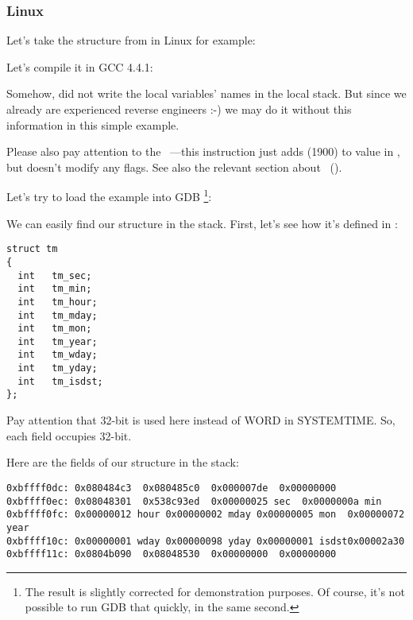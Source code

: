 ﻿\subsubsection{Linux}

Let's take the  structure from  in Linux for example:



Let's compile it in GCC 4.4.1:



Somehow, \IDA did not write the local variables' names in the local stack.
But since we already are experienced reverse engineers :-) we may do it without this information in 
this simple example.


Please also pay attention to the ~---this instruction just adds  (1900) to value in \EAX,
but doesn't modify any flags. See also the relevant section about \LEA{}~().


Let's try to load the example into GDB
\footnote{The  result is slightly corrected for demonstration purposes.
Of course, it's not possible to run GDB that quickly, in the same second.}:



We can easily find our structure in the stack.
First, let's see how it's defined in :

\begin{lstlisting}[caption=time.h, label=struct_tm]
struct tm
{
  int	tm_sec;
  int	tm_min;
  int	tm_hour;
  int	tm_mday;
  int	tm_mon;
  int	tm_year;
  int	tm_wday;
  int	tm_yday;
  int	tm_isdst;
};
\end{lstlisting}

Pay attention that
32-bit \Tint is used here instead of WORD in SYSTEMTIME.
So, each field occupies 32-bit.

Here are the fields of our structure in the stack:

\begin{lstlisting}
0xbffff0dc:	0x080484c3	0x080485c0	0x000007de	0x00000000
0xbffff0ec:	0x08048301	0x538c93ed	0x00000025 sec	0x0000000a min
0xbffff0fc:	0x00000012 hour	0x00000002 mday	0x00000005 mon 	0x00000072 year
0xbffff10c:	0x00000001 wday	0x00000098 yday	0x00000001 isdst0x00002a30
0xbffff11c:	0x0804b090	0x08048530	0x00000000	0x00000000
\end{lstlisting}


